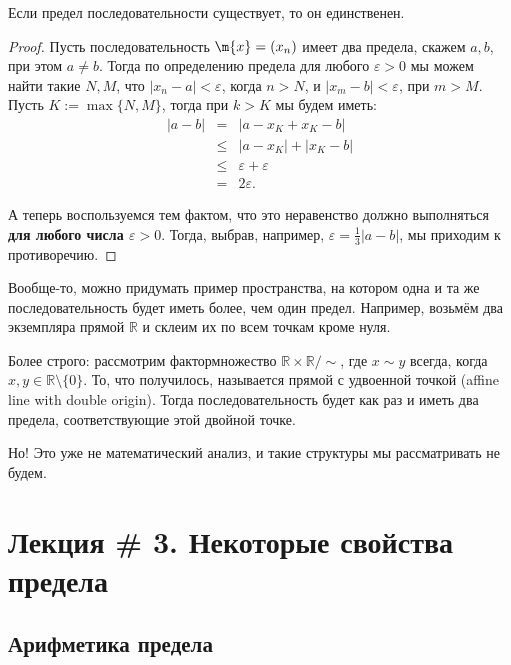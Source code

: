 \begin{theorem}
    Если предел последовательности существует, то он единственен. 
\end{theorem}
\begin{proof}
    Пусть последовательность $\m{x} = (x_n)$ имеет два предела, скажем $a,b$, при этом $a\ne b$. Тогда по определению предела для любого $\varepsilon>0$ мы можем найти такие $N, M$, что $|x_n - a|<\varepsilon$, когда $n>N$, и $|x_m-b|<\varepsilon$, при $m>M$. Пусть $K:=\max\{N,M\}$, тогда при $k>K$ мы будем иметь:
   \begin{eqnarray*}
      |a-b| &=& |a-x_K + x_K -b| \\
      &\le & |a-x_K| + |x_K-b| \\
      &\le& \varepsilon + \varepsilon \\
      &=& 2 \varepsilon.
   \end{eqnarray*}

    А теперь воспользуемся тем фактом, что это неравенство должно выполняться \textbf{для любого числа $\varepsilon>0$}. Тогда, выбрав, например, $\varepsilon = \frac{1}{3}|a-b|$, мы приходим к противоречию.
\end{proof}

\begin{remark}
Вообще-то, можно придумать пример пространства, на котором одна и та же последовательность будет иметь более, чем один предел. Например, возьмём два экземпляра прямой $\mathbb{R}$ и склеим их по всем точкам кроме нуля.
    
Более строго: рассмотрим фактормножество $\mathbb{R}\times \mathbb{R}/\sim$, где $x \sim y$ всегда, когда $x,y \in \mathbb{R}\setminus \{0\}$. То, что получилось, называется прямой с удвоенной точкой (affine line with double origin). Тогда последовательность будет как раз и иметь два предела, соответствующие этой двойной точке.

Но! Это уже не математический анализ, и такие структуры мы рассматривать не будем.
\end{remark}


\section{Лекция \# 3. Некоторые свойства предела}

\subsection{Арифметика предела}

